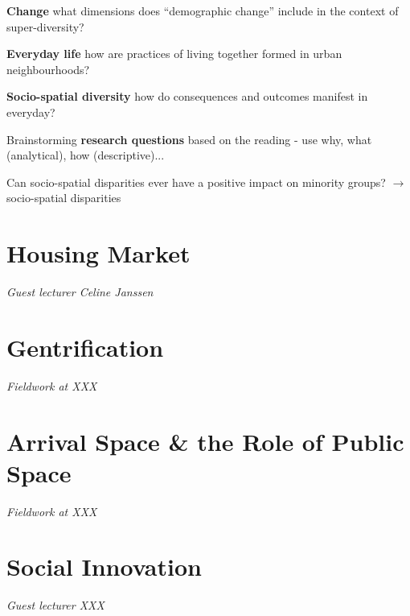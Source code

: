 \documentclass{article}
\begin{document}
\textbf{Change} what dimensions does ``demographic change'' include in the context of super-diversity?

\textbf{Everyday life} how are practices of living together formed in urban neighbourhoods?

\textbf{Socio-spatial diversity} how do consequences and outcomes manifest in everyday?

Brainstorming \textbf{research questions} based on the reading - use why, what (analytical), how (descriptive)...

\begin{outline}
	\1 Can socio-spatial disparities ever have a positive impact on minority groups? $\rightarrow$ socio-spatial disparities
\end{outline}


\section{Housing Market}

\textit{Guest lecturer Celine Janssen}


\section{Gentrification}

\textit{Fieldwork at XXX}

\section{Arrival Space \& the Role of Public Space}

\textit{Fieldwork at XXX}


\section{Social Innovation}

\textit{Guest lecturer XXX}
\end{document}
